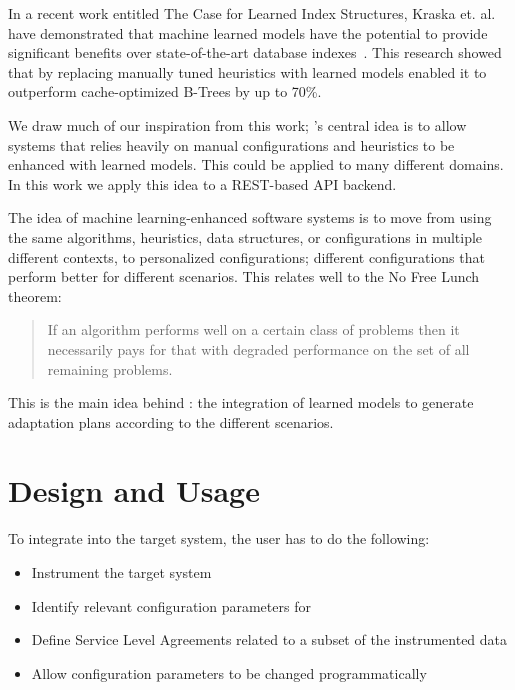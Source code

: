 In a recent work entitled The Case for Learned Index Structures, Kraska et. al. have demonstrated that machine learned models have the potential to provide significant benefits over state-of-the-art database indexes~\cite{kraska_case_2017}. This research showed that by replacing manually tuned heuristics with learned models enabled it to outperform cache-optimized B-Trees by up to 70\%.

We draw much of our inspiration from this work; \projectname{}'s central idea is to allow systems that relies heavily on manual configurations and heuristics to be enhanced with learned models. This could be applied to many different domains. In this work we apply this idea to a REST-based API backend.

The idea of machine learning-enhanced software systems is to move from using the same algorithms, heuristics, data structures, or configurations in multiple different contexts, to personalized configurations; different configurations that perform better for different scenarios. This relates well to the No Free Lunch theorem:
\begin{quote}
  If an algorithm performs well on a certain class of problems then it necessarily pays for that with degraded performance on the set of all remaining problems.
\end{quote}

This is the main idea behind \projectname{}: the integration of learned models to generate adaptation plans according to the different scenarios.

\section{Design and Usage}
\label{sec:approach}


To integrate \projectname{} into the target system, the user has to do the following:
 
\begin{itemize}
  \item Instrument the target system
  \item Identify relevant configuration parameters for \projectname{}
  \item Define Service Level Agreements related to a subset of the instrumented data
  \item Allow configuration parameters to be changed programmatically
\end{itemize}

